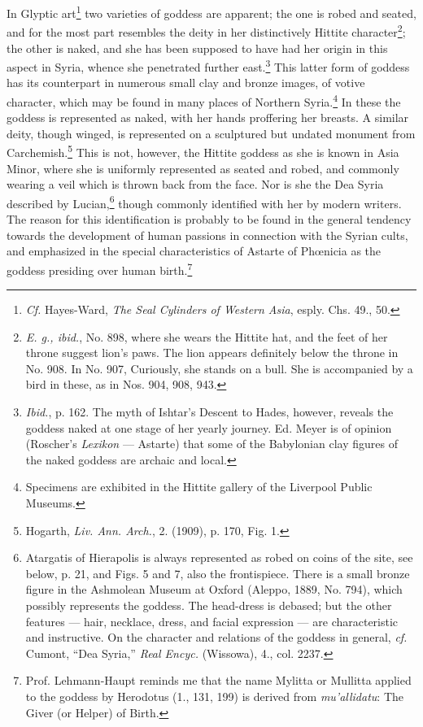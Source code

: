 \documentclass[a4paper, 11pt, oneside, polutonikogreek, english]{article}
\begin{document}
In Glyptic art\footnote{\emph{Cf.} Hayes-Ward, \emph{The Seal Cylinders of Western Asia}, esply. Chs. 49., 50.} two varieties of goddess are apparent; the one is robed and seated, and for the most part resembles the deity in her distinctively Hittite character\footnote{\emph{E. g., ibid.}, No. 898, where she wears the Hittite hat, and the feet of her throne suggest lion's paws. The lion appears definitely below the throne in No. 908. In No. 907, Curiously, she stands on a bull. She is accompanied by a bird in these, as in Nos. 904, 908, 943.}; the other is naked, and she has been supposed to have had her origin in this aspect in Syria, whence she penetrated further east.\footnote{\emph{Ibid.}, p. 162. The myth of Ishtar's Descent to Hades, however, reveals the goddess naked at one stage of her yearly journey. Ed. Meyer is of opinion (Roscher's \emph{Lexikon} --- Astarte) that some of the Babylonian clay figures of the naked goddess are archaic and local.} This latter form of goddess has its counterpart in numerous small clay and bronze images, of votive character, which may be found in many places of Northern Syria.\footnote{Specimens are exhibited in the Hittite gallery of the Liverpool Public Museums.} In these the goddess is represented as naked, with her hands proffering her breasts. A similar deity, though winged, is represented on a sculptured but undated monument from Carchemish.\footnote{Hogarth, \emph{Liv. Ann. Arch.}, 2. (1909), p. 170, Fig. 1.} This is not, however, the Hittite goddess as she is known in Asia Minor, where she is uniformly represented as seated and robed, and commonly wearing a veil which is thrown back from the face. Nor is she the Dea Syria described by Lucian,\footnote{Atargatis of Hierapolis is always represented as robed on coins of the site, see below, p. 21, and Figs. 5 and 7, also the frontispiece. There is a small bronze figure in the Ashmolean Museum at Oxford (Aleppo, 1889, No. 794), which possibly represents the goddess. The head-dress is debased; but the other features --- hair, necklace, dress, and facial expression --- are characteristic and instructive. On the character and relations of the goddess in general, \emph{cf.} Cumont, ``Dea Syria,'' \emph{Real Encyc.} (Wissowa), 4., col. 2237.} though commonly identified with her by modern writers. The reason for this identification is probably to be found in the general tendency towards the development of human passions in connection with the Syrian cults, and emphasized in the special characteristics of Astarte of Phœnicia as the goddess presiding over human birth.\footnote{Prof. Lehmann-Haupt reminds me that the name Mylitta or Mullitta applied to the goddess by Herodotus (1., 131, 199) is derived from \emph{mu'allidatu}: The Giver (or Helper) of Birth.}
\end{document}
